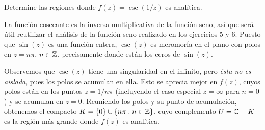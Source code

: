 \begin{exercise}
Determine las regiones donde $f(z) = \csc(1/z)$ es analítica.
\end{exercise}

\begin{solution}
La función cosecante es la inversa multiplicativa de la función seno, así que será útil reutilizar el análisis de la función seno realizado en los ejercicios 5 y 6. Puesto que $\sin(z)$ es una función entera, $\csc(z)$ es meromorfa en el plano con polos en $z = n\pi$, $n \in \mathbb Z$, precisamente donde están los ceros de $\sin(z)$.

Observemos que $\csc(z)$ tiene una singularidad en el infinito, pero \textit{ésta no es aislada}, pues los polos se acumulan en ella. Esto se aprecia mejor en $f(z)$, cuyos polos están en los puntos $z = 1/n\pi$ (incluyendo el caso especial $z = \infty$ para $n = 0$) y se acumulan en $z = 0$. Reuniendo los polos y su punto de acumulación, obtenemos el compacto $K = \{ 0 \} \cup \{ n\pi : n \in \mathbb Z \}$, cuyo complemento $U = \mathbb C - K$ es la región más grande donde $f(z)$ es analítica.
\end{solution}
